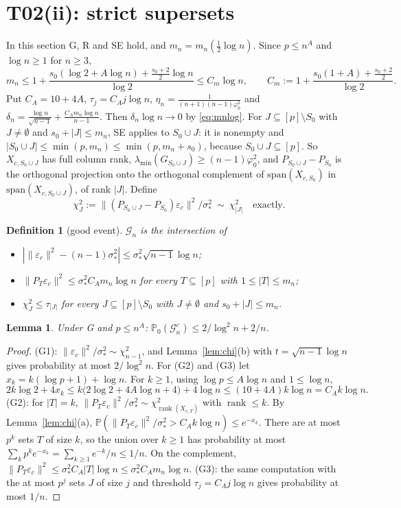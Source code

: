 \documentclass[11pt]{article}
\newtheorem{lemma}[theorem]{Lemma}
\newtheorem*{definition*}{Definition}
\theoremstyle{remark}
\newcommand{\Prob}{\mathbb P}
\newcommand{\G}{\mathcal G}
\newcommand{\eps}{\varepsilon}
\DeclareMathOperator{\rank}{rank}
\begin{document}
\section{T02(ii): strict supersets}\label{sec:T02ii}

In this section G, R and SE hold, and $m_n=m_n(\frac12\log n)$. Since $p\le n^A$ and $\log n\ge1$ for $n\ge3$,
\begin{equation}\label{eq:mnlog}
m_n\le1+\frac{s_0(\log2+A\log n)+\frac{s_0+2}2\log n}{\log2}\le C_m\log n,\qquad C_m:=1+\frac{s_0(1+A)+\frac{s_0+2}2}{\log2}.
\end{equation}
Put $C_A=10+4A$, $\tau_j=C_Aj\log n$, $\eta_n=\frac1{(n+1)(n-1)\varphi_0^2}$ and $\delta_n=\frac{\log n}{\sqrt{n-1}}+\frac{C_Am_n\log n}{n-1}$. Then $\delta_n\log n\to0$ by \eqref{eq:mnlog}. For $J\subseteq[p]\setminus S_0$ with $J\neq\emptyset$ and $s_0+|J|\le m_n$, SE applies to $S_0\cup J$: it is nonempty and $|S_0\cup J|\le\min(p,m_n)\le\min(p,m_n+s_0)$, because $S_0\cup J\subseteq[p]$. So $X_{c,S_0\cup J}$ has full column rank, $\lambda_{\min}(G_{S_0\cup J})\ge(n-1)\varphi_0^2$, and $P_{S_0\cup J}-P_{S_0}$ is the orthogonal projection onto the orthogonal complement of $\mathrm{span}(X_{c,S_0})$ in $\mathrm{span}(X_{c,S_0\cup J})$, of rank $|J|$. Define
\[
\chi^2_J:=\|(P_{S_0\cup J}-P_{S_0})\eps_c\|^2/\sigma_*^2\ \sim\ \chi^2_{|J|}\quad\text{exactly}.
\]

\begin{definition*}[good event]
$\G_n$ is the intersection of
\begin{itemize}
\item[(G1)] $|\|\eps_c\|^2-(n-1)\sigma_*^2|\le\sigma_*^2\sqrt{n-1}\log n$;
\item[(G2)] $\|P_T\eps_c\|^2\le\sigma_*^2C_Am_n\log n$ for every $T\subseteq[p]$ with $1\le|T|\le m_n$;
\item[(G3)] $\chi^2_J\le\tau_{|J|}$ for every $J\subseteq[p]\setminus S_0$ with $J\ne\emptyset$ and $s_0+|J|\le m_n$.
\end{itemize}
\end{definition*}

\begin{lemma}\label{lem:good}
Under G and $p\le n^A$: $\Prob_0(\G_n^c)\le2/\log^2n+2/n$.
\end{lemma}
\begin{proof}
(G1): $\|\eps_c\|^2/\sigma_*^2\sim\chi^2_{n-1}$, and Lemma~\ref{lem:chi}(b) with $t=\sqrt{n-1}\log n$ gives probability at most $2/\log^2n$. For (G2) and (G3) let $x_k=k(\log p+1)+\log n$. For $k\ge1$, using $\log p\le A\log n$ and $1\le\log n$,
\[
2k\log2+4x_k\le k\big(2\log2+4A\log n+4\big)+4\log n\le(10+4A)k\log n=C_Ak\log n .
\]
(G2): for $|T|=k$, $\|P_T\eps_c\|^2/\sigma_*^2\sim\chi^2_{\rank(X_{c,T})}$ with $\rank\le k$. By Lemma~\ref{lem:chi}(a), $\Prob(\|P_T\eps_c\|^2/\sigma_*^2>C_Ak\log n)\le e^{-x_k}$. There are at most $p^k$ sets $T$ of size $k$, so the union over $k\ge1$ has probability at most $\sum_kp^ke^{-x_k}=\sum_{k\ge1}e^{-k}/n\le1/n$. On the complement, $\|P_T\eps_c\|^2\le\sigma_*^2C_A|T|\log n\le\sigma_*^2C_Am_n\log n$. (G3): the same computation with the at most $p^j$ sets $J$ of size $j$ and threshold $\tau_j=C_Aj\log n$ gives probability at most $1/n$.
\end{proof}
\end{document}
